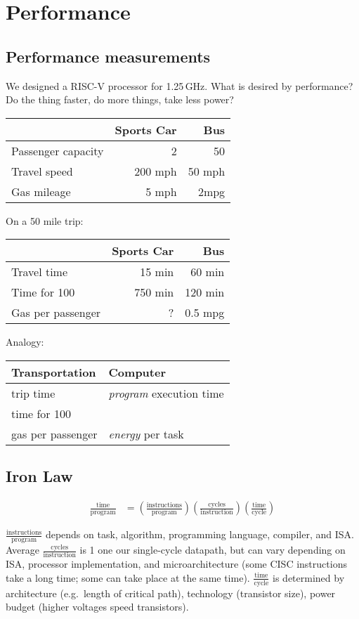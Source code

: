 \section{Performance}
\subsection{Performance measurements}
We designed a RISC-V processor for 1.25\,GHz. What is desired by performance? Do the thing faster, do more things, take less power?

\begin{tabular}{l|rr}
	& Sports Car & Bus \\\hline
	Passenger capacity & 2 & 50 \\
	Travel speed & 200 mph & 50 mph \\
	Gas mileage & 5 mph & 2mpg
\end{tabular}

On a 50 mile trip:

\begin{tabular}{l|rr}
	& Sports Car & Bus \\\hline
	Travel time & 15 min & 60 min \\
	Time for 100  & 750 min & 120 min \\
	Gas per passenger & ?  & 0.5 mpg
\end{tabular}

Analogy:

\begin{tabular}{ll}
	Transportation & Computer \\\hline
	trip time & \emph{program} execution time \\
	time for 100 &  \\
	gas per passenger & \emph{energy} per task \\
\end{tabular}

\subsection{Iron Law}
\begin{align}
	\frac{\text{time}}{\text{program}} &= 
	\left(\frac{\text{instructions}}{\text{program}}\right)
	\left(\frac{\text{cycles}}{\text{instruction}}\right)
	\left(\frac{\text{time}}{\text{cycle}}\right)
\end{align}

\(\frac{\text{instructions}}{\text{program}}\) depends on task, algorithm, programming language, compiler, and ISA. Average \(\frac{\text{cycles}}{\text{instruction}}\) is 1 one our single-cycle datapath, but can vary depending on ISA, processor implementation, and microarchitecture (some CISC instructions take a long time; some can take place at the same time). \(\frac{\text{time}}{\text{cycle}}\) is determined by architecture (e.g.~length of critical path), technology (transistor size), power budget (higher voltages speed transistors).

